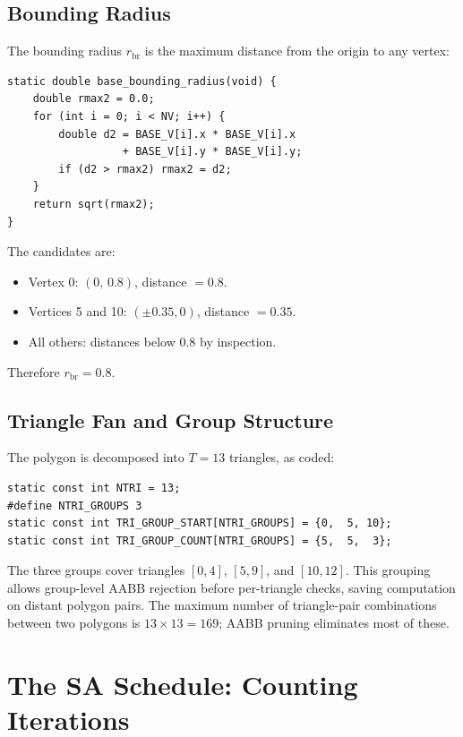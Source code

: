 \documentclass[11pt,oneside]{article}
\begin{document}
\subsection{Bounding Radius}

The bounding radius $r_{\mathrm{br}}$ is the maximum distance from the
origin to any vertex:

\begin{lstlisting}[style=cstyle,caption={\texttt{base\_bounding\_radius()} in \texttt{HPC\_parallel.c}.}]
static double base_bounding_radius(void) {
    double rmax2 = 0.0;
    for (int i = 0; i < NV; i++) {
        double d2 = BASE_V[i].x * BASE_V[i].x
                  + BASE_V[i].y * BASE_V[i].y;
        if (d2 > rmax2) rmax2 = d2;
    }
    return sqrt(rmax2);
}
\end{lstlisting}

The candidates are:
\begin{itemize}[noitemsep]
  \item Vertex 0: $(0,\,0.8)$, distance $= 0.8$.
  \item Vertices 5 and 10: $(\pm 0.35, 0)$, distance $= 0.35$.
  \item All others: distances below 0.8 by inspection.
\end{itemize}
Therefore $r_{\mathrm{br}} = 0.8$.

\subsection{Triangle Fan and Group Structure}

The polygon is decomposed into $T = 13$ triangles, as coded:

\begin{lstlisting}[style=cstyle,caption={Triangulation in \texttt{HPC\_parallel.c}.},firstnumber=1]
static const int NTRI = 13;
#define NTRI_GROUPS 3
static const int TRI_GROUP_START[NTRI_GROUPS] = {0,  5, 10};
static const int TRI_GROUP_COUNT[NTRI_GROUPS] = {5,  5,  3};
\end{lstlisting}

The three groups cover triangles $[0,4]$, $[5,9]$, and $[10,12]$.
This grouping allows group-level AABB rejection before per-triangle
checks, saving computation on distant polygon pairs. The maximum number
of triangle-pair combinations between two polygons is $13 \times 13 =
169$; AABB pruning eliminates most of these.

\section{The SA Schedule: Counting Iterations}
\label{sec:schedule}
\end{document}
